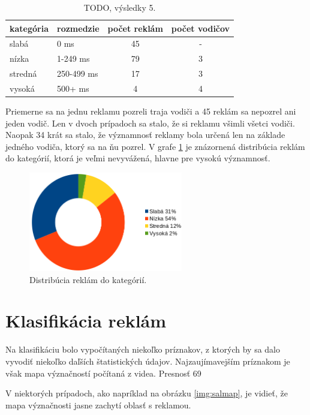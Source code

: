 \begin{table}[ht]
\centering
\begin{tabular}{|l l c c|}
 \hline
 kategória &	rozmedzie &	počet reklám &	počet vodičov \\ [0.5ex]
 \hline
slabá &	0 ms &	45 &	- \\ [0.1ex]
nízka &	1-249 ms &	79 &	3 \\ [0.1ex]
stredná &	250-499 ms &	17 &	3 \\ [0.1ex]
vysoká &	500+ ms &	4 &	4 \\ [0.1ex]
 \hline
\end{tabular}
\caption{TODO, výsledky 5.}
\label{table:cat}
\end{table}

Priemerne sa na jednu reklamu pozreli traja vodiči a 45 reklám sa nepozrel ani jeden vodič. Len v dvoch prípadoch sa stalo, že si reklamu všimli všetci vodiči. Naopak 34 krát sa stalo, že významnosť reklamy bola určená len na základe jedného vodiča, ktorý sa na ňu pozrel. V grafe \ref{img:chart} je znázornená distribúcia reklám do kategórií, ktorá je veľmi nevyvážená, hlavne pre vysokú významnosť.

\begin{figure}[ht]
    \centering
    \includegraphics[width=0.6\textwidth]{images/05/chart.png}
    \caption{Distribúcia reklám do kategórií.}
    \label{img:chart}
\end{figure}

\section{Klasifikácia reklám}

Na klasifikáciu bolo vypočítaných niekoľko príznakov, z ktorých by sa dalo vyvodiť niekoľko daľších štatistických údajov. Najzaujímavejším príznakom je však mapa význačností počítaná z videa. Presnosť 69

V niektorých prípadoch, ako napríklad na obrázku \ref{img:salmap}, je vidieť, že mapa význačnosti jasne zachytí oblasť s reklamou.

